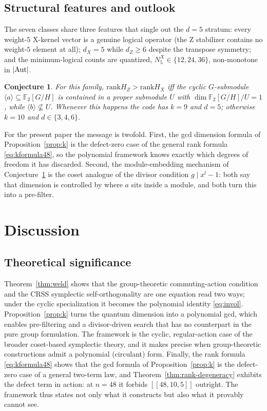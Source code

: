 \documentclass[journal,onecolumn]{IEEEtran}
\newtheorem{conjecture}[theorem]{Conjecture}
\theoremstyle{definition}
\theoremstyle{remark}
\newcommand{\F}{\mathbb{F}}
\newcommand{\rank}{\mathrm{rank}}
\begin{document}
\subsection{Structural features and outlook}
The seven classes share three features that single out the $d=5$ stratum:
every weight-$5$ X-kernel vector is a genuine logical operator (the Z
stabilizer contains no weight-$5$ element at all); $d_X=5$ while
$d_Z\ge6$ despite the transpose symmetry; and the minimum-logical counts
are quantized, $N_5^X\in\{12,24,36\}$, non-monotone in $|{\rm Aut}|$.

\begin{conjecture}\label{conj:module}
For this family, $\rank H_Z>\rank H_X$ iff the cyclic $G$-submodule
$\langle a\rangle\subseteq\F_2[G/H]$ is contained in a proper submodule
$U$ with $\dim\F_2[G/H]/U=1$, while $\langle b\rangle\not\subseteq U$.
Whenever this happens the code has $k=9$ and $d=5$; otherwise $k=10$ and
$d\in\{3,4,6\}$.
\end{conjecture}

For the present paper the message is twofold. First, the gcd dimension
formula of Proposition~\ref{prop:k} is the defect-zero case of the
general rank formula \eqref{eq:kformula48}, so the polynomial framework
knows exactly which degrees of freedom it has discarded. Second, the
module-embedding mechanism of Conjecture~\ref{conj:module} is the coset
analogue of the divisor condition $g\mid x^l-1$: both say that dimension
is controlled by where $a$ sits inside a module, and both turn this into
a pre-filter.

\section{Discussion}\label{sec:value}
\subsection{Theoretical significance}
Theorem~\ref{thm:weld} shows that the group-theoretic commuting-action
condition and the CRSS symplectic self-orthogonality are one equation read
two ways; under the cyclic specialization it becomes the polynomial
identity \eqref{eq:invol}. Proposition~\ref{prop:k} turns the quantum
dimension into a polynomial gcd, which enables pre-filtering and a
divisor-driven search that has no counterpart in the pure group
formulation. The framework is the cyclic, regular-action case of the
broader coset-based symplectic theory, and it makes precise when
group-theoretic constructions admit a polynomial (circulant) form.
Finally, the rank formula \eqref{eq:kformula48} shows that the gcd formula
of Proposition~\ref{prop:k} is the defect-zero case of a general two-term
law, and Theorem~\ref{thm:rank-degeneracy} exhibits the defect term in
action: at $n=48$ it forbids $[[48,10,5]]$ outright. The framework thus
states not only what it constructs but also what it provably cannot see.
\end{document}

